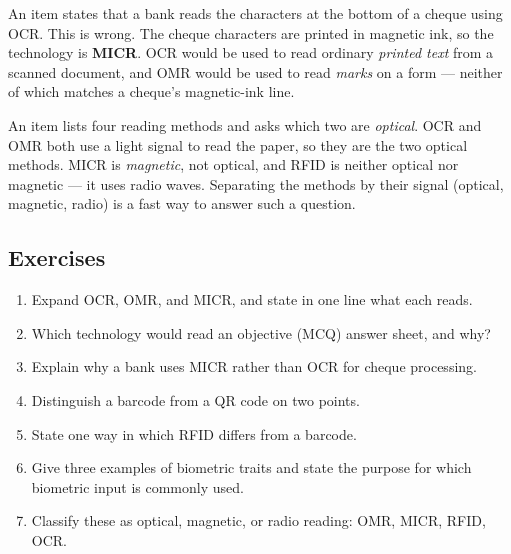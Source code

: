 \begin{example}
An item states that a bank reads the characters at the bottom of a cheque
using OCR. This is wrong. The cheque characters are printed in magnetic ink,
so the technology is \textbf{MICR}. OCR would be used to read ordinary
\emph{printed text} from a scanned document, and OMR would be used to read
\emph{marks} on a form --- neither of which matches a cheque's magnetic-ink
line.
\end{example}

\begin{example}
An item lists four reading methods and asks which two are \emph{optical}.
OCR and OMR both use a light signal to read the paper, so they are the two
optical methods. MICR is \emph{magnetic}, not optical, and RFID is neither
optical nor magnetic --- it uses radio waves. Separating the methods by their
signal (optical, magnetic, radio) is a fast way to answer such a question.
\end{example}

\subsection*{Exercises}
\begin{enumerate}[label=\arabic*.]
  \item Expand OCR, OMR, and MICR, and state in one line what each reads.
  \item Which technology would read an objective (MCQ) answer sheet, and
    why?
  \item Explain why a bank uses MICR rather than OCR for cheque processing.
  \item Distinguish a barcode from a QR code on two points.
  \item State one way in which RFID differs from a barcode.
  \item Give three examples of biometric traits and state the purpose for
    which biometric input is commonly used.
  \item Classify these as optical, magnetic, or radio reading: OMR, MICR,
    RFID, OCR.
\end{enumerate}


